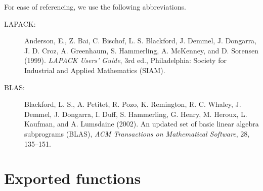 \documentclass[a4paper,oneside,10pt,DIV=12]{scrartcl}
\begin{document}
For ease of referencing, we use the following abbreviations.
\begin{description}
	\item[\small{LAPACK}:] Anderson, E., Z. Bai, C. Bischof, L. S. Blackford,
J. Demmel, J. Dongarra, J. D. Croz, A. Greenhaum, S. Hammerling, A. McKenney,
and D. Sorensen (1999). \textit{LAPACK Users’ Guide}, 3rd ed., Philadelphia:
Society for Industrial and Applied Mathematics (SIAM).
	\item[\small{BLAS}:] Blackford, L. S., A. Petitet, R. Pozo, K. Remington,
R. C. Whaley, J. Demmel, J. Dongarra, I. Duff, S. Hammerling, G. Henry,
M. Heroux, L. Kaufman, and A. Lumsdaine (2002). An updated set of basic linear
algebra subprograms (BLAS), \textit{ACM Transactions on Mathematical Software},
28, 135--151.
\end{description}



\section{Exported functions}
\end{document}
